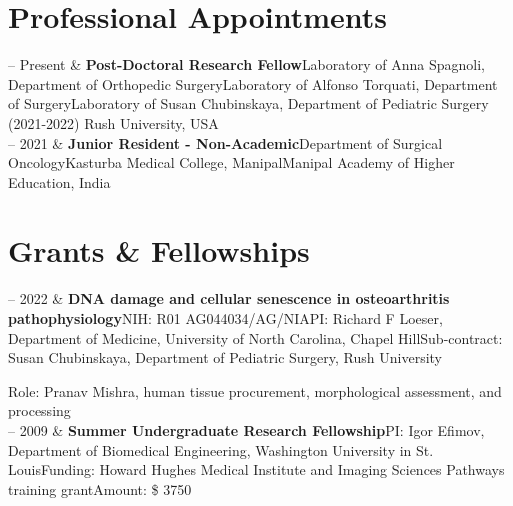 \documentclass[10pt, letterpaper]{article}
\newcommand{\WASHU}{Washington University in St. Louis}
\newcommand{\KMC}{Kasturba Medical College, Manipal}
\newcommand{\MAHE}{Manipal Academy of Higher Education}
\newcommand{\RUSH}{Rush University}
\newcommand{\RUORTHO}{Department of Orthopedic Surgery}
\newcommand{\RUPEDS}{Department of Pediatric Surgery}
\newcommand{\RUSURG}{Department of Surgery}
\newcommand{\SURGONC}{Department of Surgical Oncology}
\newcommand{\Duration}[2]{\fontsize{9pt}{0}\selectfont #1 -- #2}
\newcommand{\Ongoing}{Present} %
\newcommand{\Appointment}[4]{\textbf{#1}\newline  #2\newline  #3\newline  #4}
\begin{document}
\section{Professional Appointments}

\begin{EntriesTable}

  \Duration{2021}{\Ongoing}  &
  \Appointment{Post-Doctoral Research Fellow}
  {Laboratory of Anna Spagnoli, {\RUORTHO}}
  {Laboratory of Alfonso Torquati, {\RUSURG}}
  {Laboratory of Susan Chubinskaya, {\RUPEDS} (2021-2022)}\newline
  {\RUSH, USA}
  \\
  \Duration{2021}{2021}  &
  \Appointment{Junior Resident - Non-Academic}{\SURGONC}{\KMC}{\MAHE, India}
\end{EntriesTable}




\section{Grants \& Fellowships}

\begin{EntriesTable}

  \Duration{2021}{2022}  &
  \Appointment{DNA damage and cellular senescence in osteoarthritis pathophysiology}
  {NIH: R01 AG044034/AG/NIA}
  {PI: Richard F Loeser, Department of Medicine, University of North Carolina, Chapel Hill}
  {Sub-contract: Susan Chubinskaya, {\RUPEDS}, {\RUSH}}
  
  {Role: Pranav Mishra, human tissue procurement, morphological assessment, and processing}
  \\
  \Duration{2009}{2009}  &
  \Appointment{Summer Undergraduate Research Fellowship}
  {PI: Igor Efimov, Department of Biomedical Engineering, {\WASHU}}
  {Funding: Howard Hughes Medical Institute and Imaging Sciences Pathways training grant}
  {Amount: \$ 3750}

\end{EntriesTable}
\end{document}
